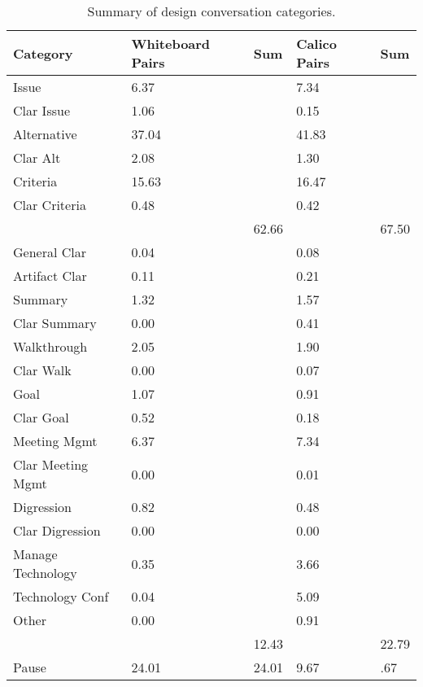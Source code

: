 \documentclass[12pt,fleqn]{ucithesis}
\begin{document}
\begin{table}
\centering
\caption{Summary of design conversation categories.}
\begin{tabular}{ p{3.5cm}p{1.5cm}p{1.5cm}p{1.5cm}p{1.5cm} }
\toprule
Category & Whiteboard Pairs & Sum & Calico Pairs & Sum \\
\midrule
Issue 		& 6.37		&	& 7.34 		&  \\
   Clar Issue	& 1.06		&	& 0.15 		&  \\
Alternative	& 37.04	&	& 41.83 	& \\
 Clar Alt	& 2.08		&	& 1.30 		&	\\
Criteria		& 15.63	& 	& 16.47 	&	\\
 Clar Criteria	& 0.48		&	& 0.42		& \\
		&		& 62.66 &		& 67.50 \\
General Clar	& 0.04		&	& 0.08		&	\\
Artifact Clar	& 0.11		&	& 0.21		&	\\
Summary	& 1.32		& 	& 1.57		&	\\
 Clar Summary & 0.00	&	& 0.41		&	\\
Walkthrough	& 2.05		&	& 1.90		&	\\
 Clar Walk	& 0.00		&	& 0.07		&	\\
Goal		& 1.07		&	& 0.91		&	\\
 Clar Goal	& 0.52		& 	& 0.18		&	\\
Meeting Mgmt	& 6.37		& 	& 7.34		&	\\
 Clar Meeting Mgmt & 0.00 &	& 0.01		&	 \\
Digression	& 0.82		&	& 0.48		& 	\\
 Clar Digression & 0.00	&	& 0.00		&	\\
Manage Technology & 0.35	&	& 3.66		&	\\
Technology Conf & 0.04	&	& 5.09		&	\\
Other		& 0.00		&	& 0.91		&	\\
		&		& 12.43 & 	& 22.79 \\
Pause		& 24.01	& 24.01 & 9.67 & .67 \\
\bottomrule
\end{tabular}
\label{table:2}
\end{table}	
\end{document}
